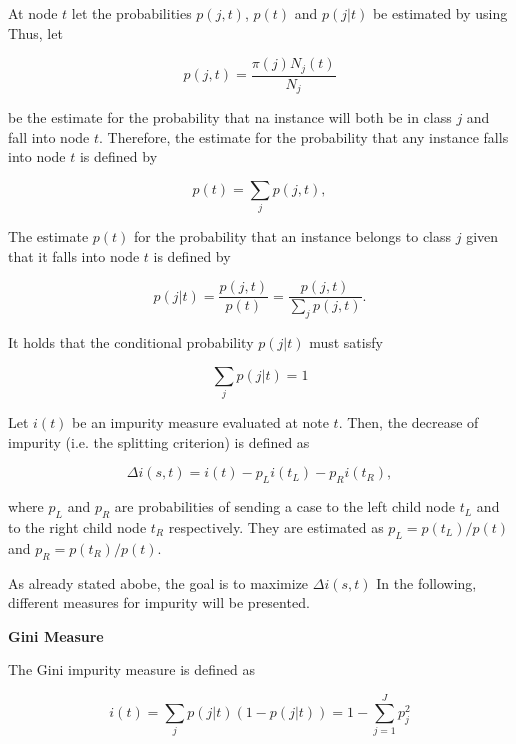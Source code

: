 At node \(t\) let the probabilities \(p(j,t)\), \(p(t)\) and \(p(j|t)\) be estimated by using
Thus, let 

\begin{equation}
    p(j,t) = \frac{ \pi(j)N_{j}(t) }{ N_{j} }
\end{equation}

be the estimate for the probability that na instance will both be in class \(j\) and fall into node \(t\).
Therefore, the estimate for the probability that any instance falls into node \(t\) is defined by

\begin{equation}
    p(t) = \sum_{j} p(j,t),
\end{equation}

The estimate \( p(t) \) for the probability that an instance belongs to class \(j\) given that it falls into node \(t\) is defined by

\begin{equation}
    p(j|t) = \frac{ p(j,t)}{ p(t) } = \frac{ p(j,t) }{ \sum_{j} p(j,t) }.
\end{equation}

It holds that the conditional probability \(p(j|t)\) must satisfy

\begin{equation}
    \sum_{j} p(j|t)  = 1
\end{equation}

Let \(i(t)\) be an impurity measure evaluated at note \(t\). Then, the decrease of impurity (i.e. the splitting criterion) is defined as

\begin{equation}
    \Delta i(s,t) = i(t) - p_{L} i(t_{L}) - p_{R} i(t_{R}),
\end{equation}

where \(p_{L}\) and \(p_{R}\) are probabilities of sending a case to the left child node \(t_{L}\) and to the
right child node \(t_{R}\) respectively. 
They are estimated as \( p_{L} = p(t_{L}) / p(t) \) and \( p_{R} = p(t_{R}) / p(t) \).

As already stated abobe, the goal is to maximize \(\Delta i(s,t)\)
In the following, different measures for impurity will be presented.

\textbf{Gini Measure}

The Gini impurity measure is defined as 


\begin{equation}
    i(t) = \sum_{j} p(j|t) (1 - p(j|t)) = 1 - \sum_{j=1}^{J} p_{j}^{2}
\end{equation}


